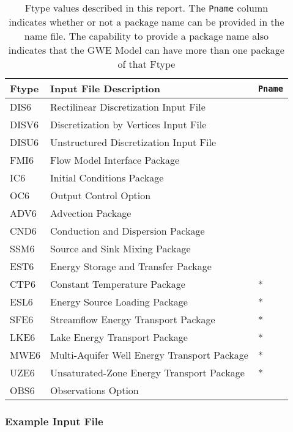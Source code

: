 \begin{table}[H]
\caption{Ftype values described in this report.  The \texttt{Pname} column indicates whether or not a package name can be provided in the name file.  The capability to provide a package name also indicates that the GWE Model can have more than one package of that Ftype}
\small
\begin{center}
\begin{tabular*}{\columnwidth}{l l l}
\hline
\hline
Ftype & Input File Description & \texttt{Pname}\\
\hline
DIS6 & Rectilinear Discretization Input File \\
DISV6 & Discretization by Vertices Input File \\
DISU6 & Unstructured Discretization Input File \\
FMI6 & Flow Model Interface Package &  \\ 
IC6 & Initial Conditions Package \\
OC6 & Output Control Option \\
ADV6 & Advection Package \\ 
CND6 & Conduction and Dispersion Package \\ 
SSM6 & Source and Sink Mixing Package \\ 
EST6 & Energy Storage and Transfer Package \\
CTP6 & Constant Temperature Package & * \\ 
ESL6 & Energy Source Loading Package & * \\
SFE6 & Streamflow Energy Transport Package & * \\
LKE6 & Lake Energy Transport Package & * \\
MWE6 & Multi-Aquifer Well Energy Transport Package & * \\
UZE6 & Unsaturated-Zone Energy Transport Package & * \\
OBS6 & Observations Option \\
\hline 
\end{tabular*}
\label{table:ftype-gwe}
\end{center}
\normalsize
\end{table}

\vspace{5mm}
\subsubsection{Example Input File}


